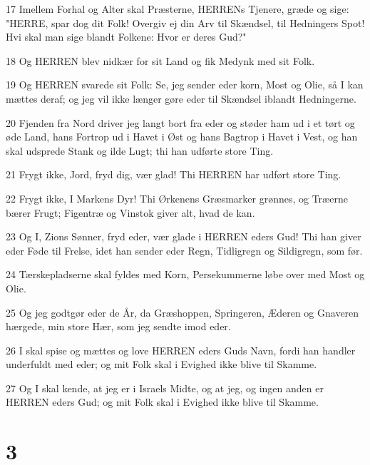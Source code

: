 \par 17 Imellem Forhal og Alter skal Præsterne, HERRENs Tjenere, græde og sige: "HERRE, spar dog dit Folk! Overgiv ej din Arv til Skændsel, til Hedningers Spot! Hvi skal man sige blandt Folkene: Hvor er deres Gud?"
\par 18 Og HERREN blev nidkær for sit Land og fik Medynk med sit Folk.
\par 19 Og HERREN svarede sit Folk: Se, jeg sender eder korn, Most og Olie, så I kan mættes deraf; og jeg vil ikke længer gøre eder til Skændsel iblandt Hedningerne.
\par 20 Fjenden fra Nord driver jeg langt bort fra eder og støder ham ud i et tørt og øde Land, hans Fortrop ud i Havet i Øst og hans Bagtrop i Havet i Vest, og han skal udsprede Stank og ilde Lugt; thi han udførte store Ting.
\par 21 Frygt ikke, Jord, fryd dig, vær glad! Thi HERREN har udført store Ting.
\par 22 Frygt ikke, I Markens Dyr! Thi Ørkenens Græsmarker grønnes, og Træerne bærer Frugt; Figentræ og Vinstok giver alt, hvad de kan.
\par 23 Og I, Zions Sønner, fryd eder, vær glade i HERREN eders Gud! Thi han giver eder Føde til Frelse, idet han sender eder Regn, Tidligregn og Sildigregn, som før.
\par 24 Tærskepladserne skal fyldes med Korn, Persekummerne løbe over med Most og Olie.
\par 25 Og jeg godtgør eder de År, da Græshoppen, Springeren, Æderen og Gnaveren hærgede, min store Hær, som jeg sendte imod eder.
\par 26 I skal spise og mættes og love HERREN eders Guds Navn, fordi han handler underfuldt med eder; og mit Folk skal i Evighed ikke blive til Skamme.
\par 27 Og I skal kende, at jeg er i Israels Midte, og at jeg, og ingen anden er HERREN eders Gud; og mit Folk skal i Evighed ikke blive til Skamme.

\chapter{3}

